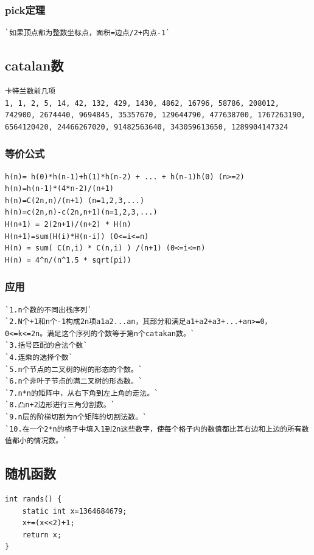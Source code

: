 \documentclass[a4paper]{article}
\begin{document}
\begin{CJK*}{UTF8}{gbsn}
\begin{multicols}{3}
\begin{flushleft}
\subsubsection{pick定理}
\begin{lstlisting}
`如果顶点都为整数坐标点，面积=边点/2+内点-1`
\end{lstlisting}

\subsection{catalan数}
\begin{lstlisting}
卡特兰数前几项
1, 1, 2, 5, 14, 42, 132, 429, 1430, 4862, 16796, 58786, 208012, 742900, 2674440, 9694845, 35357670, 129644790, 477638700, 1767263190, 6564120420, 24466267020, 91482563640, 343059613650, 1289904147324 
\end{lstlisting}

\subsubsection{等价公式}
\begin{lstlisting}
h(n)= h(0)*h(n-1)+h(1)*h(n-2) + ... + h(n-1)h(0) (n>=2)
h(n)=h(n-1)*(4*n-2)/(n+1)
h(n)=C(2n,n)/(n+1) (n=1,2,3,...)
h(n)=c(2n,n)-c(2n,n+1)(n=1,2,3,...)
H(n+1) = 2(2n+1)/(n+2) * H(n)
H(n+1)=sum(H(i)*H(n-i)) (0<=i<=n)
H(n) = sum( C(n,i) * C(n,i) ) /(n+1) (0<=i<=n)
H(n) = 4^n/(n^1.5 * sqrt(pi))
\end{lstlisting}

\subsubsection{应用}
\begin{lstlisting}
`1.n个数的不同出栈序列`
`2.N个+1和n个-1构成2n项a1a2...an，其部分和满足a1+a2+a3+...+an>=0，0<=k<=2n。满足这个序列的个数等于第n个catakan数。`
`3.括号匹配的合法个数`
`4.连乘的选择个数`
`5.n个节点的二叉树的树的形态的个数。`
`6.n个非叶子节点的满二叉树的形态数。`
`7.n*n的矩阵中，从右下角到左上角的走法。`
`8.凸n+2边形进行三角分割数。`
`9.n层的阶梯切割为n个矩阵的切割法数。`
`10.在一个2*n的格子中填入1到2n这些数字，使每个格子内的数值都比其右边和上边的所有数值都小的情况数。`
\end{lstlisting}

\subsection{随机函数}
\begin{lstlisting}
int rands() {
    static int x=1364684679;
    x+=(x<<2)+1;
    return x;
}
\end{lstlisting}


\end{flushleft}
\end{multicols}
\end{CJK*}
\end{document}
